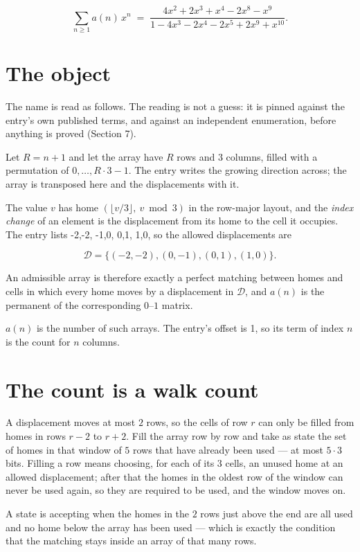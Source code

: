\documentclass[11pt]{article}
\theoremstyle{definition}
\begin{document}
\[\sum_{n \ge 1} a(n)\,x^n \;=\; \frac{4x^{2} + 2x^{3} + x^{4} - 2x^{8} - x^{9}}{1 - 4x^{3} - 2x^{4} - 2x^{5} + 2x^{9} + x^{10}}.\]

\section{The object}

The name is read as follows. The reading is not a guess: it is pinned against the entry's own published terms, and against an independent enumeration, before anything is proved (Section 7).

Let $R = n + 1$ and let the array have $R$ rows and $3$ columns, filled with a permutation of $0,\dots,R\cdot3-1$. The entry writes the growing direction across; the array is transposed here and the displacements with it.

The value $v$ has home $(\lfloor v/3\rfloor,\ v \bmod 3)$ in the row-major layout, and the {\itshape index change} of an element is the displacement from its home to the cell it occupies. The entry lists -2,-2, -1,0, 0,1, 1,0, so the allowed displacements are

\[\mathcal{D} = \{(-2,-2), (0,-1), (0,1), (1,0)\}.\]

An admissible array is therefore exactly a perfect matching between homes and cells in which every home moves by a displacement in $\mathcal{D}$, and $a(n)$ is the permanent of the corresponding $0$--$1$ matrix.

$a(n)$ is the number of such arrays. The entry's offset is 1, so its term of index $n$ is the count for $n$ columns.

\section{The count is a walk count}

A displacement moves at most $2$ rows, so the cells of row $r$ can only be filled from homes in rows $r-2$ to $r+2$. Fill the array row by row and take as state the set of homes in that window of $5$ rows that have already been used --- at most $5\cdot3$ bits. Filling a row means choosing, for each of its $3$ cells, an unused home at an allowed displacement; after that the homes in the oldest row of the window can never be used again, so they are required to be used, and the window moves on.

A state is accepting when the homes in the $2$ rows just above the end are all used and no home below the array has been used --- which is exactly the condition that the matching stays inside an array of that many rows.
\end{document}
